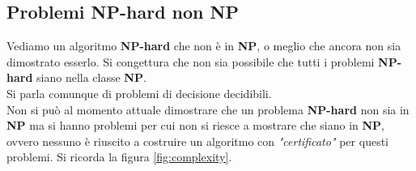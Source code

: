 \subsection{Problemi NP-hard non NP}
Vediamo un algoritmo \textbf{NP-hard} che non è in \textbf{NP}, o meglio che
ancora non sia dimostrato esserlo.
Si congettura che non sia possibile che tutti i problemi \textbf{NP-hard} siano
nella classe \textbf{NP}.\\ 
Si parla comunque di problemi di decisione decidibili.\\
Non si può al momento attuale dimostrare che un problema \textbf{NP-hard} non sia
in \textbf{NP} ma si hanno problemi per cui non si riesce a mostrare che siano
in \textbf{NP}, ovvero nessuno è riuscito a costruire un algoritmo con
\textit{"certificato"} per questi problemi. Si ricorda la figura
\ref{fig:complexity}.
